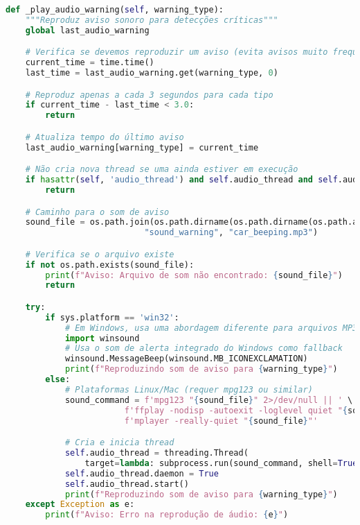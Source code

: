 \documentclass[
	12pt,				%
	oneside, %
	a4paper,			%
	english,			%
	french,				%
	spanish,			%
	brazil				%
	]{abntex2}
\begin{document}
\begin{apendicesenv}
\begin{lstlisting}[language=Python, caption=Método para reprodução de avisos sonoros., label=lst:play_audio_warning]
def _play_audio_warning(self, warning_type):
    """Reproduz aviso sonoro para detecções críticas"""
    global last_audio_warning

    # Verifica se devemos reproduzir um aviso (evita avisos muito frequentes)
    current_time = time.time()
    last_time = last_audio_warning.get(warning_type, 0)

    # Reproduz apenas a cada 3 segundos para cada tipo
    if current_time - last_time < 3.0:
        return

    # Atualiza tempo do último aviso
    last_audio_warning[warning_type] = current_time

    # Não cria nova thread se uma ainda estiver em execução
    if hasattr(self, 'audio_thread') and self.audio_thread and self.audio_thread.is_alive():
        return

    # Caminho para o som de aviso
    sound_file = os.path.join(os.path.dirname(os.path.dirname(os.path.abspath(__file__))),
                            "sound_warning", "car_beeping.mp3")

    # Verifica se o arquivo existe
    if not os.path.exists(sound_file):
        print(f"Aviso: Arquivo de som não encontrado: {sound_file}")
        return

    try:
        if sys.platform == 'win32':
            # Em Windows, usa uma abordagem diferente para arquivos MP3
            import winsound
            # Usa o som de alerta integrado do Windows como fallback
            winsound.MessageBeep(winsound.MB_ICONEXCLAMATION)
            print(f"Reproduzindo som de aviso para {warning_type}")
        else:
            # Plataformas Linux/Mac (requer mpg123 ou similar)
            sound_command = f'mpg123 "{sound_file}" 2>/dev/null || ' \
                        f'ffplay -nodisp -autoexit -loglevel quiet "{sound_file}" || ' \
                        f'mplayer -really-quiet "{sound_file}"'

            # Cria e inicia thread
            self.audio_thread = threading.Thread(
                target=lambda: subprocess.run(sound_command, shell=True, timeout=5))
            self.audio_thread.daemon = True
            self.audio_thread.start()
            print(f"Reproduzindo som de aviso para {warning_type}")
    except Exception as e:
        print(f"Aviso: Erro na reprodução de áudio: {e}")
\end{lstlisting}


\end{apendicesenv}
\end{document}
